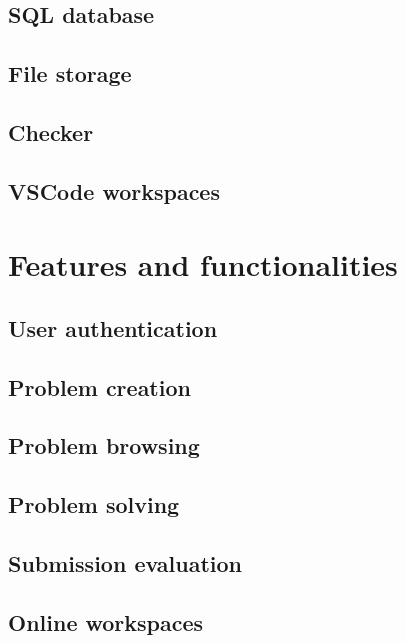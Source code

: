 \documentclass[12pt,a4paper]{report}
\begin{document}
\section{SQL database}

\section{File storage}

\section{Checker}

\section{VSCode workspaces}



\chapter{Features and functionalities}
\section{User authentication}

\section{Problem creation}

\section{Problem browsing}

\section{Problem solving}

\section{Submission evaluation}

\section{Online workspaces}



\end{document}

